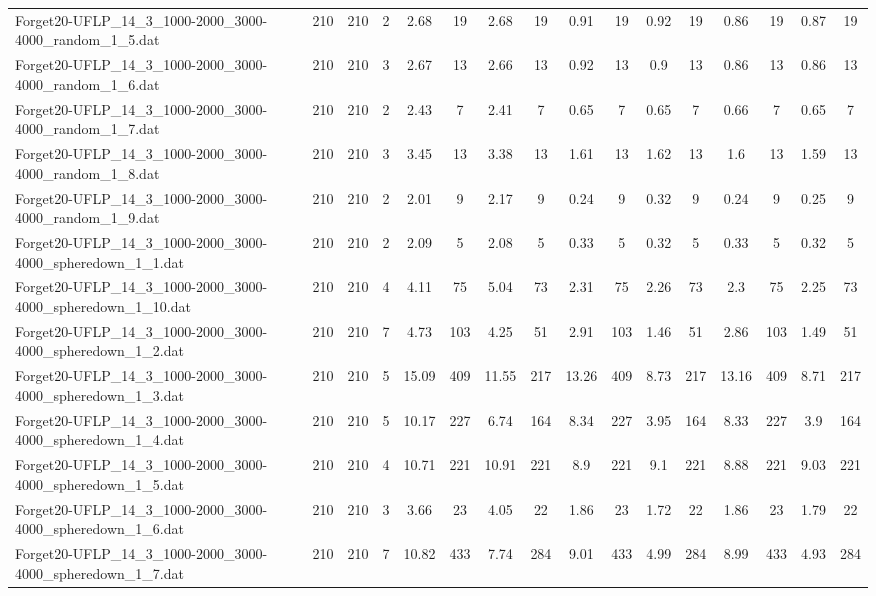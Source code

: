 \begin{sidewaystable}[!ht]
{\begin{tabular}{lccccccccccccccc}
Forget20-UFLP\_14\_3\_1000-2000\_3000-4000\_random\_1\_5.dat & 210 & 210 & 2 & 2.68 & 19 & 2.68 & 19 & 0.91 & 19 & 0.92 & 19 &  \textcolor{blue2}{0.86} & 19 & 0.87 & 19 \\
Forget20-UFLP\_14\_3\_1000-2000\_3000-4000\_random\_1\_6.dat & 210 & 210 & 3 & 2.67 & 13 & 2.66 & 13 & 0.92 & 13 & 0.9 & 13 &  \textcolor{blue2}{0.86} & 13 &  \textcolor{blue2}{0.86} & 13 \\
Forget20-UFLP\_14\_3\_1000-2000\_3000-4000\_random\_1\_7.dat & 210 & 210 & 2 & 2.43 & 7 & 2.41 & 7 &  \textcolor{blue2}{0.65} & 7 &  \textcolor{blue2}{0.65} & 7 & 0.66 & 7 &  \textcolor{blue2}{0.65} & 7 \\
Forget20-UFLP\_14\_3\_1000-2000\_3000-4000\_random\_1\_8.dat & 210 & 210 & 3 & 3.45 & 13 & 3.38 & 13 & 1.61 & 13 & 1.62 & 13 & 1.6 & 13 & 1.59 & 13 \\
Forget20-UFLP\_14\_3\_1000-2000\_3000-4000\_random\_1\_9.dat & 210 & 210 & 2 & 2.01 & 9 & 2.17 & 9 &  \textcolor{blue2}{0.24} & 9 & 0.32 & 9 &  \textcolor{blue2}{0.24} & 9 & 0.25 & 9 \\
Forget20-UFLP\_14\_3\_1000-2000\_3000-4000\_spheredown\_1\_1.dat & 210 & 210 & 2 & 2.09 & 5 & 2.08 & 5 & 0.33 & 5 &  \textcolor{blue2}{0.32} & 5 & 0.33 & 5 &  \textcolor{blue2}{0.32} & 5 \\
Forget20-UFLP\_14\_3\_1000-2000\_3000-4000\_spheredown\_1\_10.dat & 210 & 210 & 4 & 4.11 & 75 & 5.04 & 73 & 2.31 & 75 & 2.26 & 73 & 2.3 & 75 & 2.25 & 73 \\
Forget20-UFLP\_14\_3\_1000-2000\_3000-4000\_spheredown\_1\_2.dat & 210 & 210 & 7 & 4.73 & 103 & 4.25 & 51 & 2.91 & 103 & 1.46 & 51 & 2.86 & 103 & 1.49 & 51 \\
Forget20-UFLP\_14\_3\_1000-2000\_3000-4000\_spheredown\_1\_3.dat & 210 & 210 & 5 & 15.09 & 409 & 11.55 & 217 & 13.26 & 409 & 8.73 & 217 & 13.16 & 409 & 8.71 & 217 \\
Forget20-UFLP\_14\_3\_1000-2000\_3000-4000\_spheredown\_1\_4.dat & 210 & 210 & 5 & 10.17 & 227 & 6.74 & 164 & 8.34 & 227 & 3.95 & 164 & 8.33 & 227 &  \textcolor{blue2}{3.9} & 164 \\
Forget20-UFLP\_14\_3\_1000-2000\_3000-4000\_spheredown\_1\_5.dat & 210 & 210 & 4 & 10.71 & 221 & 10.91 & 221 & 8.9 & 221 & 9.1 & 221 & 8.88 & 221 & 9.03 & 221 \\
Forget20-UFLP\_14\_3\_1000-2000\_3000-4000\_spheredown\_1\_6.dat & 210 & 210 & 3 & 3.66 & 23 & 4.05 & 22 & 1.86 & 23 &  \textcolor{blue2}{1.72} & 22 & 1.86 & 23 & 1.79 & 22 \\
Forget20-UFLP\_14\_3\_1000-2000\_3000-4000\_spheredown\_1\_7.dat & 210 & 210 & 7 & 10.82 & 433 & 7.74 & 284 & 9.01 & 433 & 4.99 & 284 & 8.99 & 433 & 4.93 & 284 \\

\end{tabular}}
\end{sidewaystable}
